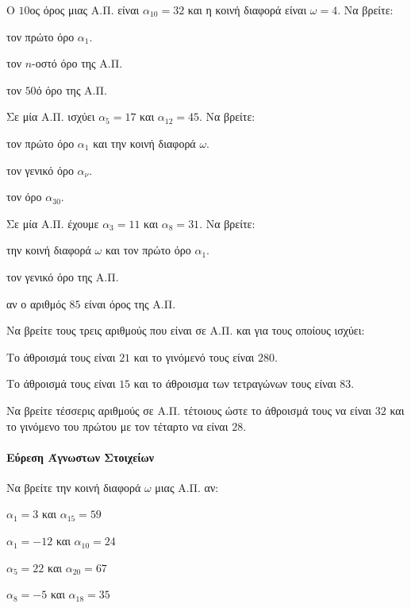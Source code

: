 \documentclass[11pt,a4paper,modern]{FFExercises}
\begin{document}
\askhsh Ο $10$ος όρος μιας Α.Π. είναι $\alpha_{10}=32$ και η κοινή διαφορά είναι $\omega=4$. Να βρείτε:
\begin{alist}
\item τον πρώτο όρο $\alpha_1$.
\item τον $n$-οστό όρο της Α.Π.
\item τον $50$ό όρο της Α.Π.
\end{alist}

\askhsh Σε μία Α.Π. ισχύει $\alpha_5=17$ και $\alpha_{12}=45$. Να βρείτε:
\begin{alist}
\item τον πρώτο όρο $\alpha_1$ και την κοινή διαφορά $\omega$.
\item τον γενικό όρο $\alpha_{\nu}$.
\item τον όρο $\alpha_{30}$.
\end{alist}

\askhsh Σε μία Α.Π. έχουμε $\alpha_3=11$ και $\alpha_8=31$. Να βρείτε:
\begin{alist}
\item την κοινή διαφορά $\omega$ και τον πρώτο όρο $\alpha_1$.
\item τον γενικό όρο της Α.Π.
\item αν ο αριθμός $85$ είναι όρος της Α.Π.
\end{alist}

\askhsh Να βρείτε τους τρεις αριθμούς που είναι σε Α.Π. και για τους οποίους ισχύει:
\begin{alist}
\item Το άθροισμά τους είναι $21$ και το γινόμενό τους είναι $280$.
\item Το άθροισμά τους είναι $15$ και το άθροισμα των τετραγώνων τους είναι $83$.
\end{alist}

\askhsh Να βρείτε τέσσερις αριθμούς σε Α.Π. τέτοιους ώστε το άθροισμά τους να είναι $32$ και το γινόμενο του πρώτου με τον τέταρτο να είναι $28$.\\

\paragraph{Εύρεση Άγνωστων Στοιχείων}

\askhsh Να βρείτε την κοινή διαφορά $\omega$ μιας Α.Π. αν:
\begin{alist}
\item $\alpha_1=3$ και $\alpha_{15}=59$
\item $\alpha_1=-12$ και $\alpha_{10}=24$
\item $\alpha_5=22$ και $\alpha_{20}=67$
\item $\alpha_8=-5$ και $\alpha_{18}=35$
\end{alist}
\end{document}
